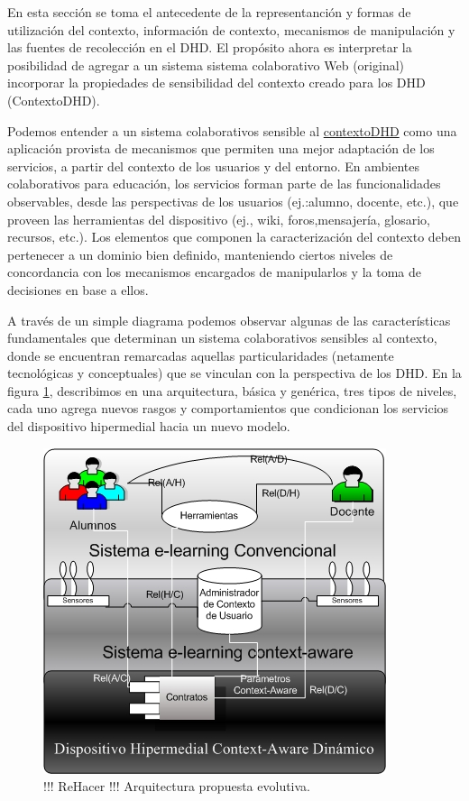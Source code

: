 En esta sección se toma el antecedente de la representanción y
formas de utilización del contexto, información de contexto, mecanismos de
manipulación y las fuentes de recolección en el DHD. El propósito ahora es
interpretar la posibilidad de agregar a un sistema sistema
colaborativo Web (original) incorporar la propiedades de sensibilidad del
contexto creado para los DHD (ContextoDHD).

Podemos entender a un sistema colaborativos sensible al
\hyperref[contextodhd]{contextoDHD} como una
aplicación provista de mecanismos que permiten una mejor adaptación de los
servicios, a partir del contexto de los usuarios y del entorno. En ambientes
colaborativos para educación, los servicios forman parte de las funcionalidades
observables, desde las perspectivas de los usuarios (ej.:alumno, docente, etc.),
que proveen las herramientas del dispositivo (ej., wiki, foros,mensajería,
glosario, recursos, etc.). Los elementos que componen la caracterización del
contexto deben pertenecer a un dominio bien definido, manteniendo ciertos
niveles de concordancia con los mecanismos encargados de manipularlos y la toma
de decisiones en base a ellos.

A través de un simple diagrama podemos observar algunas de las características
fundamentales que determinan un sistema colaborativos sensibles al contexto,
donde se
encuentran remarcadas aquellas particularidades (netamente tecnológicas y
conceptuales) que se vinculan con la perspectiva de los DHD. En la figura
\ref{fig:evolucion}, describimos en una arquitectura, básica y genérica, tres
tipos de niveles, cada uno agrega nuevos rasgos y comportamientos que
condicionan los servicios del dispositivo hipermedial hacia un nuevo modelo.

\begin{figure}
\begin{center}
 \includegraphics[width=4 in,totalheight=4in] {Ch1/f1.jpg}
\caption{!!! ReHacer !!! Arquitectura propuesta
evolutiva.}\label{fig:evolucion}
\end{center}
\end{figure}

